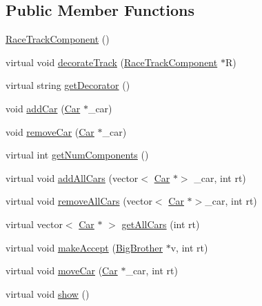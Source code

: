 \subsection*{Public Member Functions}
\begin{DoxyCompactItemize}
\item 
\mbox{\hyperlink{class_race_track_component_a1dd8ed4c6c3833dd0a4372ade8609afb}{Race\+Track\+Component}} ()
\item 
virtual void \mbox{\hyperlink{class_race_track_component_af32bdea381a07dd2bb8f851164fc102b}{decorate\+Track}} (\mbox{\hyperlink{class_race_track_component}{Race\+Track\+Component}} $\ast$R)
\item 
virtual string \mbox{\hyperlink{class_race_track_component_a2998bbf7b576eff0e355166646ed46e8}{get\+Decorator}} ()
\item 
void \mbox{\hyperlink{class_race_track_component_aafa6492a0249238db0b91a36cf9bf55b}{add\+Car}} (\mbox{\hyperlink{class_car}{Car}} $\ast$\+\_\+car)
\item 
void \mbox{\hyperlink{class_race_track_component_a68594f9436ad820a62430d59ae433273}{remove\+Car}} (\mbox{\hyperlink{class_car}{Car}} $\ast$\+\_\+car)
\item 
virtual int \mbox{\hyperlink{class_race_track_component_a6b57a071d1f11ddccd416fdbfe7e973b}{get\+Num\+Components}} ()
\item 
virtual void \mbox{\hyperlink{class_race_track_component_afb51617f25b639cf0a98a42a86120937}{add\+All\+Cars}} (vector$<$ \mbox{\hyperlink{class_car}{Car}} $\ast$$>$ \+\_\+car, int rt)
\item 
virtual void \mbox{\hyperlink{class_race_track_component_a0d073a7d844143f5c4cebf2a2bb0cee7}{remove\+All\+Cars}} (vector$<$ \mbox{\hyperlink{class_car}{Car}} $\ast$$>$\+\_\+car, int rt)
\item 
virtual vector$<$ \mbox{\hyperlink{class_car}{Car}} $\ast$ $>$ \mbox{\hyperlink{class_race_track_component_a3a2453934d3795376c23e251b2d3f99d}{get\+All\+Cars}} (int rt)
\item 
virtual void \mbox{\hyperlink{class_race_track_component_a7cfe0c366248474e2665d42724c09bca}{make\+Accept}} (\mbox{\hyperlink{class_big_brother}{Big\+Brother}} $\ast$v, int rt)
\item 
virtual void \mbox{\hyperlink{class_race_track_component_a1925fdddd2cc1541fe649152bacb58ca}{move\+Car}} (\mbox{\hyperlink{class_car}{Car}} $\ast$\+\_\+car, int rt)
\item 
virtual void \mbox{\hyperlink{class_race_track_component_a109347e296fe7df389f157c01344a79a}{show}} ()

\end{DoxyCompactItemize}
